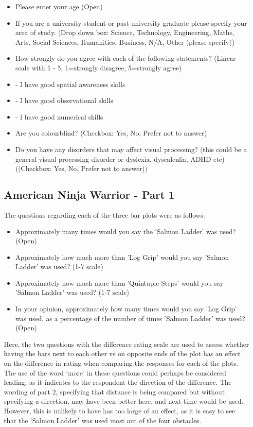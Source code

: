 \documentclass[
  11pt,
]{book}
\begin{document}
\begin{itemize}
    \item Please enter your age (Open)
    \item If you are a university student or past university graduate please specify your area of study. (Drop down box: Science, Technology, Engineering, Maths, Arts, Social Sciences, Humanities, Business, N/A, Other (please specify))
    \item How strongly do you agree with each of the following statements? (Linear scale with 1 - 5, 1=strongly disagree, 5=strongly agree)
    \item  - I have good spatial awareness skills 
    \item  - I have good observational skills 
    \item  - I have good numerical skills 
    \item Are you colourblind? (Checkbox: Yes, No, Prefer not to answer)
    \item Do you have any disorders that may affect visual processing? (this could be a general visual processing disorder 
    or dyslexia, dyscalculia, ADHD etc)
    ((Checkbox: Yes, No, Prefer not to answer))
\end{itemize}

\subsection{American Ninja Warrior - Part 1}

The questions regarding each of the three bar plots were as follows:

\begin{itemize}
  \item Approximately many times would you say the 'Salmon Ladder' was used? (Open)
  \item Approximately how much more than 'Log Grip' would you say 'Salmon Ladder' was used? (1-7 scale)
  \item Approximately how much more than 'Quintuple Steps' would you say 'Salmon Ladder' was used? (1-7 scale)
  \item In your opinion, approximately how many times would you say 'Log Grip' was used, as a percentage of the number of times 'Salmon Ladder' was used? (Open)
\end{itemize}

Here, the two questions with the difference rating scale are used to
assess whether having the bars next to each other vs on opposite ends of
the plot has an effect on the difference in rating when comparing the
responses for each of the plots. The use of the word `more' in these
questions could perhaps be considered leading, as it indicates to the
respondent the direction of the difference. The wording of part 2,
specifying that distance is being compared but without specifying a
direction, may have been better here, and next time would be used.
However, this is unlikely to have has too large of an effect, as it is
easy to see that the `Salmon Ladder' was used most out of the four
obstacles.
\end{document}
